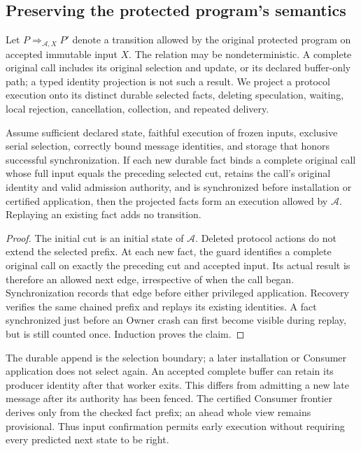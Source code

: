 \subsection{Preserving the protected program's semantics}
\label{subsec:native_refinement}
Let $P \mathrel{\Rightarrow_{\mathcal A,X}} P'$ denote a transition allowed
by the original protected program on accepted immutable input $X$.
The relation may be nondeterministic. A complete original call includes
its original selection and update, or its declared buffer-only path;
a typed identity projection is not such a result. We project a protocol
execution onto its distinct durable selected facts, deleting speculation,
waiting, local rejection, cancellation, collection, and repeated delivery.

\begin{proposition}
\label{prop:refinement}
Assume sufficient declared state, faithful execution of frozen inputs,
exclusive serial selection, correctly bound message identities, and
storage that honors successful synchronization. If each new durable fact
binds a complete original call whose full input equals the preceding
selected cut, retains the call's original identity and valid admission
authority, and is synchronized before installation or certified
application, then the projected facts form an execution allowed by
$\mathcal A$. Replaying an existing fact adds no transition.
\end{proposition}
\begin{proof}
The initial cut is an initial state of $\mathcal A$. Deleted protocol
actions do not extend the selected prefix. At each new fact, the guard
identifies a complete original call on exactly the preceding cut and
accepted input. Its actual result is therefore an allowed next edge,
irrespective of when the call began. Synchronization records that edge
before either privileged application. Recovery verifies the same chained
prefix and replays its existing identities. A fact synchronized just
before an Owner crash can first become visible during replay, but is
still counted once. Induction proves the claim.
\end{proof}

The durable append is the selection boundary; a later installation or
Consumer application does not select again. An accepted complete buffer
can retain its producer identity after that worker exits. This differs
from admitting a new late message after its authority has been fenced.
The certified Consumer frontier derives only from the checked fact prefix;
an ahead whole view remains provisional. Thus input confirmation permits
early execution without requiring every predicted next state to be right.


